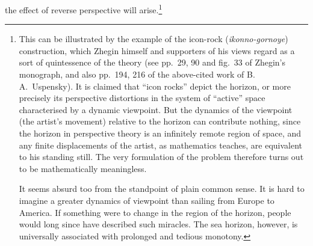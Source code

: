 the effect of reverse perspective will arise.\footnote{%
  This can be illustrated by the example of the icon-rock (\emph{ikonno-gornoye})
  construction, which Zhegin himself and supporters of his views regard as a sort of
  quintessence of the theory (see pp.~29, 90 and fig.~33 of Zhegin's monograph, and
  also pp.~194, 216 of the above-cited work of B.\,A.~Uspensky).  It is claimed that
  ``icon rocks'' depict the horizon, or more precisely its perspective distortions in
  the system of ``active'' space characterised by a dynamic viewpoint.  But the
  dynamics of the viewpoint (the artist's movement) relative to the horizon can
  contribute nothing, since the horizon in perspective theory is an infinitely remote
  region of space, and any finite displacements of the artist, as mathematics teaches,
  are equivalent to his standing still.  The very formulation of the problem therefore
  turns out to be mathematically meaningless.

  It seems absurd too from the standpoint of plain common sense.  It is hard to
  imagine a greater dynamics of viewpoint than sailing from Europe to America.  If
  something were to change in the region of the horizon, people would long since have
  described such miracles.  The sea horizon, however, is universally associated with
  prolonged and tedious monotony.

}
